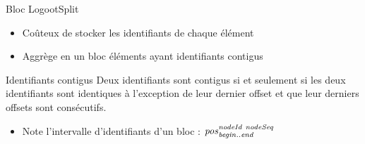 \begin{frame}[fragile]{Bloc LogootSplit}
    \begin{itemize}
        \item Coûteux de stocker les identifiants de chaque élément
    \end{itemize}
    \begin{figure}[!ht]
    \end{figure}
    \pause
    \begin{itemize}
        \item Aggrège en un \alert{bloc} éléments ayant \alert{identifiants contigus}
    \end{itemize}
    \begin{block}{Identifiants contigus}
        Deux identifiants sont contigus si et seulement si les deux identifiants sont identiques à l'exception de leur dernier offset et que leur derniers offsets sont consécutifs.
    \end{block}
    \pause
    \begin{itemize}
        \item Note l'intervalle d'identifiants d'un bloc : $\mathit{pos}^{\mathit{nodeId~nodeSeq}}_{\mathit{begin..end}}$
    \end{itemize}
    \begin{figure}[!ht]
    \end{figure}
\end{frame}

